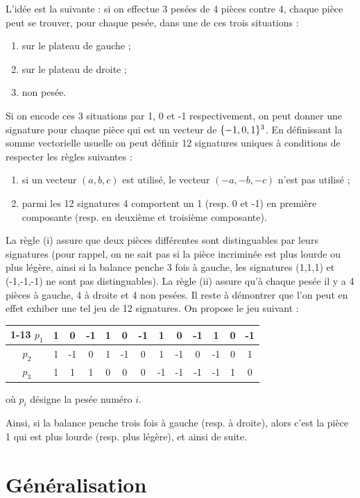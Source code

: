 L'idée est la suivante : si on effectue 3 pesées de 4 pièces contre 4, 
chaque pièce peut se trouver, pour chaque pesée, dans une de ces trois situations :
\begin{enumerate}
\item sur le plateau de gauche ;
\item sur le plateau de droite ;
\item non pesée.
\end{enumerate}
Si on encode ces 3 situations par 1, 0 et -1 respectivement, 
on peut donner une signature pour chaque pièce qui est un vecteur de $\{ -1,0,1 \}^3$.
En définissant la somme vectorielle usuelle on peut définir 12 signatures uniques à conditions de respecter les règles suivantes :
\begin{enumerate}[label=(\roman*)]
\item si un vecteur $(a,b,c)$ est utilisé, le vecteur $(-a,-b,-c)$ n'est pas utilisé ;
\item parmi les 12 signatures 4 comportent un 1 (resp. 0 et -1) en première composante (resp. en deuxième et troisième composante).
\end{enumerate}
La règle (i) assure que deux pièces différentes sont distinguables par leurs signatures (pour rappel, on ne sait pas si la pièce incriminée
est plus lourde ou plus légère, ainsi si la balance penche 3 fois à gauche, les signatures (1,1,1) et (-1,-1,-1) ne sont pas distinguables).
La règle (ii) assure qu'à chaque pesée il y a 4 pièces à gauche, 4 à droite et 4 non pesées.
Il reste à démontrer que l'on peut en effet exhiber une tel jeu de 12 signatures.
On propose le jeu suivant :
\begin{center}
\begin{tabular}{ | c || c | c | c | c | c | c | c | c | c | c | c | c |}
\cline{1-13}
$p_1$ & 1 & 0 & -1 & 1 & 0 & -1 & 1 & 0 & -1 & 1 & 0 & -1 \\ \hline
$p_2$ & 1 & -1 & 0 & 1 & -1 & 0 & 1 & -1 & 0 & -1 & 0 & 1 \\ \hline
$p_3$ & 1 & 1 & 1 & 0 & 0 & 0 & -1 & -1 & -1 & -1 & 1 & 0 \\ \hline
\end{tabular}
\end{center}

où $p_i$ désigne la pesée numéro $i$.

Ainsi, si la balance penche trois fois à gauche (resp. à droite), alors c'est la pièce 1 qui est plus lourde (resp. plus légère), 
et ainsi de suite.

\section{Généralisation}

